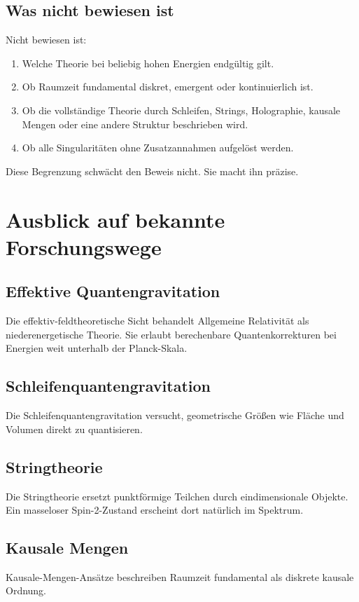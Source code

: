 \documentclass[11pt,a4paper,oneside]{book}
\theoremstyle{definition}
\theoremstyle{plain}
\theoremstyle{remark}
\begin{document}
\section{Was nicht bewiesen ist}
Nicht bewiesen ist:

\begin{enumerate}[label=\arabic*.]
\item Welche Theorie bei beliebig hohen Energien endgültig gilt.
\item Ob Raumzeit fundamental diskret, emergent oder kontinuierlich ist.
\item Ob die vollständige Theorie durch Schleifen, Strings, Holographie, kausale Mengen oder eine andere Struktur beschrieben wird.
\item Ob alle Singularitäten ohne Zusatzannahmen aufgelöst werden.
\end{enumerate}

Diese Begrenzung schwächt den Beweis nicht. Sie macht ihn präzise.

\chapter{Ausblick auf bekannte Forschungswege}
\section{Effektive Quantengravitation}
Die effektiv-feldtheoretische Sicht behandelt Allgemeine Relativität als niederenergetische Theorie. Sie erlaubt berechenbare Quantenkorrekturen bei Energien weit unterhalb der Planck-Skala.

\section{Schleifenquantengravitation}
Die Schleifenquantengravitation versucht, geometrische Größen wie Fläche und Volumen direkt zu quantisieren.

\section{Stringtheorie}
Die Stringtheorie ersetzt punktförmige Teilchen durch eindimensionale Objekte. Ein masseloser Spin-2-Zustand erscheint dort natürlich im Spektrum.

\section{Kausale Mengen}
Kausale-Mengen-Ansätze beschreiben Raumzeit fundamental als diskrete kausale Ordnung.
\end{document}
